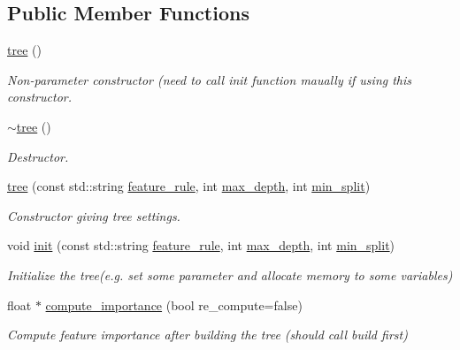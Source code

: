 \subsection*{Public Member Functions}
\begin{DoxyCompactItemize}
\item 
\hyperlink{classtree_a9f2a566ac2710fafc31232456780e82d}{tree} ()
\begin{DoxyCompactList}\small\item\em Non-\/parameter constructor (need to call {\ttfamily init} function maually if using this constructor. \end{DoxyCompactList}\item 
\hyperlink{classtree_a05f3faa3c9a8f6fed237e2d0f6172244}{$\sim$tree} ()
\begin{DoxyCompactList}\small\item\em Destructor. \end{DoxyCompactList}\item 
\hyperlink{classtree_a356d6ebfe68b6e4ac466664c4f2d2581}{tree} (const std\+::string \hyperlink{classtree_a5aba3b77a347165517a20d5fab94382d}{feature\+\_\+rule}, int \hyperlink{classtree_a0a9f968fac827d3239be67488c34fb21}{max\+\_\+depth}, int \hyperlink{classtree_ae70cd626c0b50a0b8306a94a9e5e8fd7}{min\+\_\+split})
\begin{DoxyCompactList}\small\item\em Constructor giving tree settings. \end{DoxyCompactList}\item 
void \hyperlink{classtree_a03aebcb3102b4f6503b5bc69288297e8}{init} (const std\+::string \hyperlink{classtree_a5aba3b77a347165517a20d5fab94382d}{feature\+\_\+rule}, int \hyperlink{classtree_a0a9f968fac827d3239be67488c34fb21}{max\+\_\+depth}, int \hyperlink{classtree_ae70cd626c0b50a0b8306a94a9e5e8fd7}{min\+\_\+split})
\begin{DoxyCompactList}\small\item\em Initialize the tree(e.\+g. set some parameter and allocate memory to some variables) \end{DoxyCompactList}\item 
float $\ast$ \hyperlink{classtree_ae03f6dd2597846c65c1c037728b06bcd}{compute\+\_\+importance} (bool re\+\_\+compute=false)
\begin{DoxyCompactList}\small\item\em Compute feature importance after building the tree (should call build first) \end{DoxyCompactList}\item 

\end{DoxyCompactItemize}
